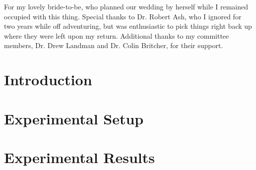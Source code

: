\documentclass[12pt, openany]{report}	%
\begin{document}
\beforepreface

For my lovely bride-to-be, who planned our wedding by herself while I remained 
occupied with this thing. Special thanks to Dr. Robert Ash, who I ignored for 
two years while off adventuring, but was enthusiastic to pick things right 
back up where they were left upon my return. Additional thanks to my committee 
members, Dr. Drew Landman and Dr. Colin Britcher, for their support. 

%
\fi

\afterpreface
\iftrue		%
\chapter{Introduction}



\fi
\iftrue		%
\chapter{Experimental Setup}







\fi
\iftrue		%
\chapter{Experimental Results}
\label{chapter:results}


\fi
\iftrue		%
\end{document}
